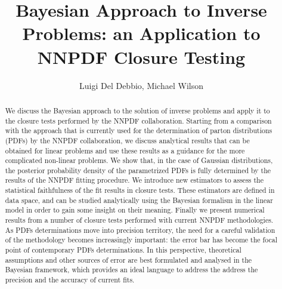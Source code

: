 \documentclass[11pt]{article}
\title{Bayesian Approach to Inverse Problems: an Application to NNPDF Closure Testing}
\author{Luigi Del Debbio, Michael Wilson}
\begin{document}
\maketitle

\begin{abstract}
    We discuss the Bayesian approach to the solution of inverse problems and apply it to the
    closure tests performed by the NNPDF collaboration. Starting from a comparison with
    the approach that is currently used for the determination of parton distributions 
    (PDFs) by the NNPDF collaboration, we discuss analytical results that can be obtained for 
    linear problems and use these results as a guidance for the more complicated non-linear problems. 
    We show that, in the case of Gaussian distributions, the posterior probability density
    of the parametrized PDFs is fully determined by the results of the NNPDF fitting procedure. 
    We introduce new estimators to assess the statistical faithfulness of the fit results in 
    closure tests. These estimators are defined in data space, and can be studied analytically 
    using the Bayesian formalism in the linear model in order to gain some insight on their
    meaning. Finally we present numerical results from a number of closure tests performed 
    with current NNPDF methodologies. As PDFs determinations move into precision territory, 
    the need for a careful validation of the methodology becomes increasingly important: the error
    bar has become the focal point of contemporary PDFs determinations. In this perspective,
    theoretical assumptions and other sources of error are best formulated and analysed
    in the Bayesian framework, which provides an ideal language to address the address the 
    precision and the accuracy of current fits. 

\end{abstract}





%
%


\appendix





\end{document}
